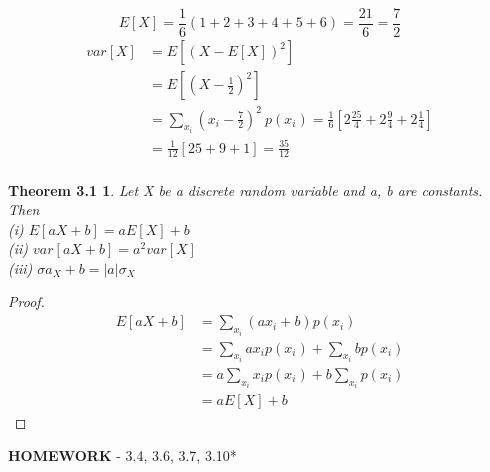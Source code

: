 \documentclass{letter}
\begin{document}
\[ E[X] = \frac{1}{6}(1+2+3+4+5+6) = \frac{21}{6} = \frac{7}{2} \]
\begin{align*}
var[X] & = E[(X-E[X])^2]\\
& =E[(X- \frac{1}{2})^2]\\
& =\sum_{x_i}( x_i- \frac{7}{2} )^2\ p(x_i) = \frac{1}{6} \left[ 2\frac{25}{4}+2\frac{9}{4}+2\frac{1}{4} \right] \\
& =\frac{1}{12}[25+9+1]=\frac{35}{12}\\
\end{align*}
\pagebreak

\theoremstyle{nonum}
\newtheorem{threetwo}{Theorem 3.1}
\begin{threetwo}
Let X be a discrete random variable and a, b are constants. Then\\
(i) $E[aX+b] = aE[X]+b$\\
(ii) $var[aX+b] = a^2 var[X]$\\
(iii) $\sigma a_X+b = |a| \sigma_{X}$\\
\end{threetwo}
\begin{proof}
\begin{align*}
E[aX+b] & = \sum_{x_i}(ax_i+b)p(x_i)\\
& =\sum_{x_i}ax_i p(x_i)+\sum_{x_i}bp(x_i)\\
& =a\sum_{x_i} x_i p(x_i) + b\sum_{x_i} p(x_i)\\
& =aE[X]+b
\end{align*}
\end{proof}
\textbf{HOMEWORK} - 3.4, 3.6, 3.7, 3.10*
\end{document}
